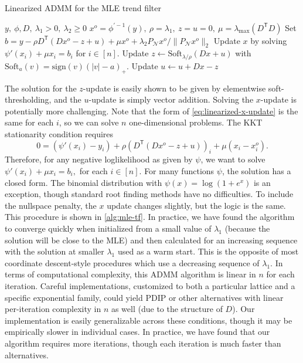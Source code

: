 \documentclass[ejs,noshowframe]{imsart}
\theoremstyle{plain}
\theoremstyle{definition}
\newcommand{\cN}{\mathcal{N}}
\renewcommand{\top}{\mathsf{T}}
\begin{document}
\begin{algorithm}[tb!]
  \caption{Linearized ADMM for the MLE trend filter}
  \label{alg:mle-tf}
  \begin{algorithmic}[1]
     $y,\ \phi, D,\ \lambda_1>0,\ \lambda_2\ge 0$
     $x^o = \phi^{'-1}(y),\ \rho = \lambda_1,\ z = u =
    0,\ \mu = \lambda_{\max}(D^\top D)$
    \STATE Set $b = y - \rho D^\top (Dx^o - z + u) + \mu x^o + \lambda_2 
    P_{\cN} x^o / \|  P_{\cN} x^o \|_2$
    \STATE Update $x$ by solving $\psi'(x_i) + \mu x_i = b_i$ for $i\in [n]$.
    \STATE Update $z \leftarrow \mathrm{Soft}_{\lambda/\rho}(Dx + u)$ with
    $\mathrm{Soft}_a(v) = \mathrm{sign}(v)(|v| - a)_+$.
    \STATE Update $u\leftarrow u + Dx - z$
    \ENDWHILE
  \end{algorithmic}
\end{algorithm}


The solution for the $z$-update is easily shown to be given by elementwise soft-thresholding,
and the $u$-update is 
simply vector addition. Solving the $x$-update is potentially more challenging.
Note that the form of \eqref{eq:linearized-x-update} is the same for each $i$,
so we can solve $n$ one-dimensional problems.  
The KKT stationarity condition requires
$$
	0 =\left(\psi'(x_i) - y_i\right)  + \rho \left( D^\top \left(D x^o -
	z+u\right)\right)_i + \mu( x_i-x_i^o).
$$
Therefore, for any negative loglikelihood as given by $\psi$, we want to solve
$
\psi'(x_i) + \mu x_i = b_i,
$
for each $i\in[n]$. For many functions $\psi$, the solution has a closed form. The
binomial distribution with $\psi(x) = \log(1+e^x)$ is an exception, though
standard root finding methods have no difficulties.
To include the nullspace penalty, the $x$ update changes slightly, but the
logic is the same. This procedure is shown in \autoref{alg:mle-tf}. In practice,
we have found the algorithm to converge quickly when initialized from a small value
of $\lambda_1$ (because the solution will be close to the MLE) and then
calculated for an increasing sequence with the solution at smaller
$\lambda_1$ used as a warm start. This is the opposite of most coordinate descent-style 
procedures which use a decreasing sequence of $\lambda_1$. In terms of
computational complexity, this ADMM algorithm is linear in $n$ for each iteration.
Careful implementations,
customized to both a particular lattice and a specific exponential family,
could yield PDIP or other alternatives with linear per-iteration complexity in
$n$ as well (due to the 
structure of $D$). Our implementation is easily generalizable across these
conditions, though it may be empirically slower in individual cases. In
practice, we have found that our algorithm requires more iterations, though each
iteration is much faster than alternatives.
\end{document}

